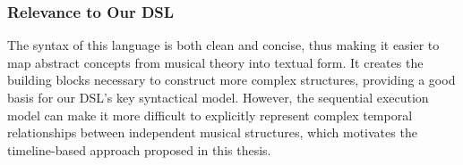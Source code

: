 
\subsubsection{Relevance to Our DSL}

The syntax of this language is both clean and concise, thus making it easier to map abstract concepts from musical
theory into textual form.
It creates the building blocks necessary to construct more complex structures, providing a good basis for our DSL's key
syntactical model.
However, the sequential execution model can make it more difficult to explicitly represent complex temporal
relationships between independent musical structures, which motivates the timeline-based approach proposed in this
thesis.
